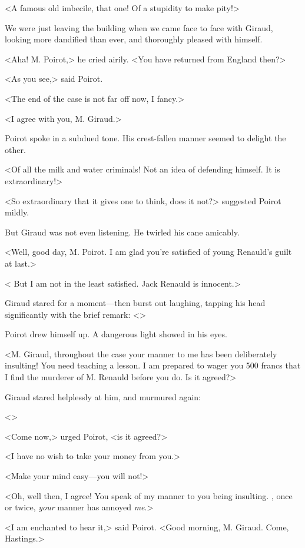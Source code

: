  <A famous old imbecile, that one! Of a stupidity to make pity!> 

 We were just leaving the building when we came face to face with Giraud, looking more dandified than ever, and thoroughly pleased with himself. 

 <Aha! M. Poirot,> he cried airily. <You have returned from England then?> 

 <As you see,> said Poirot. 

 <The end of the case is not far off now, I fancy.> 

 <I agree with you, M. Giraud.> 

 Poirot spoke in a subdued tone. His crest-fallen manner seemed to delight the other. 

 <Of all the milk and water criminals! Not an idea of defending himself. It is extraordinary!> 

 <So extraordinary that it gives one to think, does it not?> suggested Poirot mildly. 

 But Giraud was not even listening. He twirled his cane amicably. 

 <Well, good day, M. Poirot. I am glad you're satisfied of young Renauld's guilt at last.> 

 < But I am not in the least satisfied. Jack Renauld is innocent.> 

 Giraud stared for a moment—then burst out laughing, tapping his head significantly with the brief remark: <> 

 Poirot drew himself up. A dangerous light showed in his eyes. 

 <M. Giraud, throughout the case your manner to me has been deliberately insulting! You need teaching a lesson. I am prepared to wager you 500 francs that I find the murderer of M. Renauld before you do. Is it agreed?> 

 Giraud stared helplessly at him, and murmured again: 

 <> 

 <Come now,> urged Poirot, <is it agreed?> 

 <I have no wish to take your money from you.> 

 <Make your mind easy—you will not!> 

 <Oh, well then, I agree! You speak of my manner to you being insulting. , once or twice, \emph{your} manner has annoyed \emph{me}.> 

 <I am enchanted to hear it,> said Poirot. <Good morning, M. Giraud. Come, Hastings.> 

